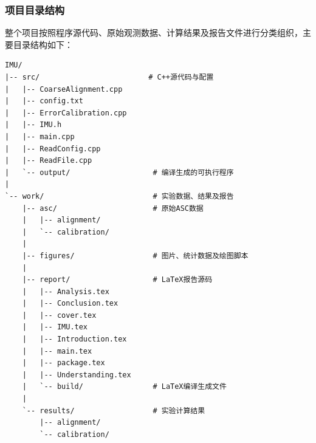 \subsubsection{项目目录结构}

整个项目按照程序源代码、原始观测数据、计算结果及报告文件进行分类组织，主要目录结构如下：

\begin{verbatim}
IMU/
|-- src/                         # C++源代码与配置
|   |-- CoarseAlignment.cpp
|   |-- config.txt
|   |-- ErrorCalibration.cpp
|   |-- IMU.h
|   |-- main.cpp
|   |-- ReadConfig.cpp
|   |-- ReadFile.cpp
|   `-- output/                   # 编译生成的可执行程序
|
`-- work/                         # 实验数据、结果及报告
    |-- asc/                      # 原始ASC数据
    |   |-- alignment/
    |   `-- calibration/
    |
    |-- figures/                  # 图片、统计数据及绘图脚本
    |
    |-- report/                   # LaTeX报告源码
    |   |-- Analysis.tex
    |   |-- Conclusion.tex
    |   |-- cover.tex
    |   |-- IMU.tex
    |   |-- Introduction.tex
    |   |-- main.tex
    |   |-- package.tex
    |   |-- Understanding.tex
    |   `-- build/                # LaTeX编译生成文件
    |
    `-- results/                  # 实验计算结果
        |-- alignment/
        `-- calibration/
\end{verbatim}



